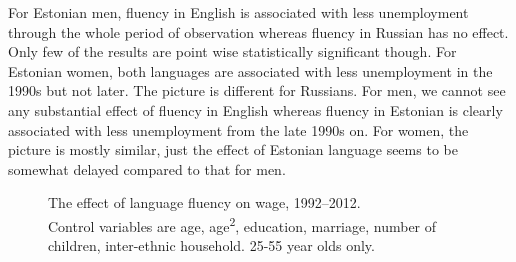 \documentclass[12pt, a4paper]{article}
\newcommand{\modelTwo}{age, age\textsuperscript{2}, education, marriage, number of children, inter-ethnic household}
\newcommand{\agerestrictions}{25-55 year olds only.}
\begin{document}
For Estonian men, fluency in English is associated with less unemployment through the whole
period of observation whereas fluency in Russian has no effect.
Only few of the results are point wise statistically significant though.
For Estonian women, both languages are associated with less
unemployment in the 1990s but not later. The picture is different for
Russians. For men, we cannot see any substantial effect of fluency in English
whereas fluency in Estonian is clearly associated with less unemployment from
the late 1990s on. For women, the picture is mostly similar, just the
effect of Estonian language seems to be somewhat delayed compared to
that for men.

\begin{figure}[tb!]
	\centering
	\caption{The effect of language fluency on wage, 1992--2012. \\ Control variables are \modelTwo. \agerestrictions}
	\label{fig:long-run_wage}
\end{figure}
\end{document}
